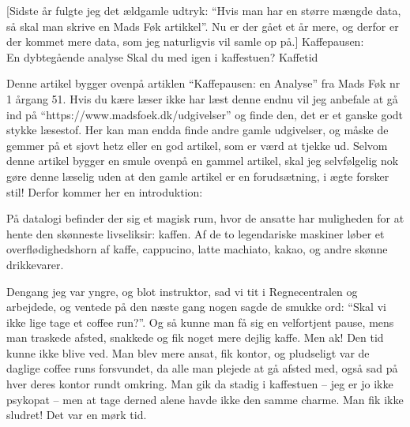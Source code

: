 \begin{article}
[Sidste år fulgte jeg det ældgamle udtryk: ``Hvis man har en større mængde data, så skal man skrive en Mads Føk artikkel''. Nu er der gået et år mere, og derfor er der kommet mere data, som jeg naturligvis vil samle op på.]
{Kaffepausen: \\ {\large En dybtegående analyse}}
{Skal du med igen i kaffestuen?}
{Kaffetid \protect\coffee\ }

\renewcommand{\figurename}{Figur.}


\noindent
Denne artikel bygger ovenpå artiklen ``Kaffepausen: en Analyse'' fra Mads Føk nr 1 årgang 51. Hvis du kære læser ikke har læst denne endnu vil jeg anbefale at gå ind på ``https://www.madsfoek.dk/udgivelser'' og finde den, det er et ganske godt stykke læsestof. Her kan man endda finde andre gamle udgivelser, og måske de gemmer på et sjovt hetz eller en god artikel, som er værd at tjekke ud.
Selvom denne artikel bygger en smule ovenpå en gammel artikel, skal jeg selvfølgelig nok gøre denne læselig uden at den gamle artikel er en forudsætning, i ægte forsker stil!
Derfor kommer her en introduktion:

På datalogi befinder der sig et magisk rum, hvor de ansatte har muligheden for at hente den skønneste livseliksir: kaffen. Af de to legendariske maskiner løber et overflødighedshorn af kaffe, cappucino, latte machiato, kakao, og andre skønne drikkevarer.

Dengang jeg var yngre, og blot instruktor, sad vi tit i Regnecentralen og arbejdede, og ventede på den næste gang nogen sagde de smukke ord: ``Skal vi ikke lige tage et coffee run?''. Og så kunne man få sig en velfortjent pause, mens man traskede afsted, snakkede og fik noget mere dejlig kaffe. Men ak! Den tid kunne ikke blive ved. Man blev mere ansat, fik kontor, og pludseligt var de daglige coffee runs forsvundet, da alle man plejede at gå afsted med, også sad på hver deres kontor rundt omkring. Man gik da stadig i kaffestuen -- jeg er jo ikke psykopat -- men at tage derned alene havde ikke den samme charme. Man fik ikke sludret! Det var en mørk tid.


\end{article}
